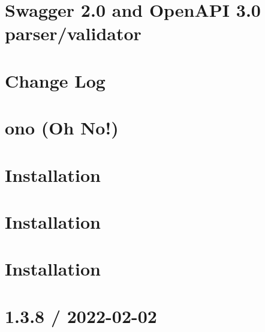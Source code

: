 \documentclass[twoside]{book}
\newcommand{\+}{\discretionary{\mbox{\scriptsize$\hookleftarrow$}}{}{}}
\begin{document}
\chapter{Swagger 2.0 and Open\+API 3.0 parser/validator}
\label{md_src_nodejs_node_modules__apidevtools_swagger_parser_README}

\chapter{Change Log}
\label{md_src_nodejs_node_modules__jsdevtools_ono_CHANGELOG}

\chapter{ono (Oh No!)}
\label{md_src_nodejs_node_modules__jsdevtools_ono_README}

\chapter{Installation}
\label{md_src_nodejs_node_modules__types_geojson_README}

\chapter{Installation}
\label{md_src_nodejs_node_modules__types_json_schema_README}

\chapter{Installation}
\label{md_src_nodejs_node_modules__types_node_README}

\chapter{1.3.8 / 2022-\/02-\/02}
\label{md_src_nodejs_node_modules_accepts_HISTORY}

\end{document}
